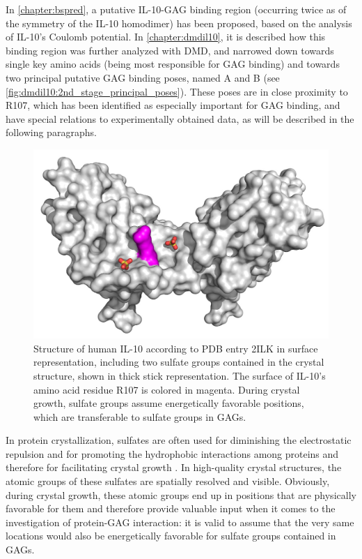 In \cref{chapter:bspred}, a putative IL-10-GAG binding region (occurring twice
as of the symmetry of the IL-10 homodimer) has been proposed, based on the
analysis of IL-10's Coulomb potential. In \cref{chapter:dmdil10}, it is
described how this binding region was further analyzed with DMD, and narrowed
down towards single key amino acids (being most responsible for GAG binding) and
towards two principal putative GAG binding poses, named A and B (see
\cref{fig:dmdil10:2nd_stage_principal_poses}). These poses are in close
proximity to R107, which has been identified as especially important for GAG
binding, and have special relations to experimentally obtained data, as will be
described in the following paragraphs.

\begin{figure}
\centering
\includegraphics[width=1.0\textwidth]{gfx/together/il10sulfates_01.jpg}
\caption[]{
Structure of human IL-10 according to PDB entry 2ILK in surface representation,
including two sulfate groups contained in the crystal structure, shown in thick
stick representation. The surface of IL-10's amino acid residue R107 is colored
in magenta. During crystal growth, sulfate groups assume energetically favorable
positions, which are transferable to sulfate groups in GAGs.}
\label{fig:together:il10sulfates}
\end{figure}

In protein crystallization, sulfates are often used for diminishing the
electrostatic repulsion and for promoting the hydrophobic interactions among
proteins and therefore for facilitating crystal growth
\cite{crystal_salts_2001}. In high-quality crystal structures, the atomic groups
of these sulfates are spatially resolved and visible. Obviously, during crystal
growth, these atomic groups end up in positions that are physically favorable
for them and therefore provide valuable input when it comes to the investigation
of protein-GAG interaction: it is valid to assume that the very same locations
would also be energetically favorable for sulfate groups contained in GAGs.

